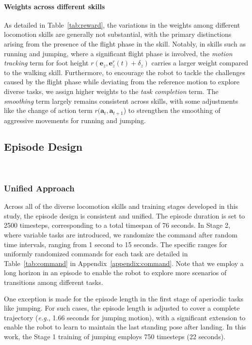 \paragraph{Weights across different skills}
As detailed in Table~\ref{tab:reward}, the variations in the weights among different locomotion skills are generally not substantial, with the primary distinctions arising from the presence of the flight phase in the skill. 
Notably, in skills such as running and jumping, where a significant flight phase is involved, the \textit{motion tracking} term for foot height $r(\mathbf{e}_z, \mathbf{e}^r_z(t) + \delta_z)$ carries a larger weight compared to the walking skill.
Furthermore, to encourage the robot to tackle the challenges caused by the flight phase while deviating from the reference motion to explore diverse tasks, we assign higher weights to the \textit{task completion} term. 
The \textit{smoothing} term largely remains consistent across skills, with some adjustments like the change of action term $r(\mathbf{a}_t, \mathbf{a}_{t+1}$) to strengthen the smoothing of aggressive movements for running and jumping.





\subsection{Episode Design}~\label{subsec:episode_design}

\subsubsection{Unified Approach}
Across all of the diverse locomotion skills and training stages developed in this study, the episode design is consistent and unified. 
The episode duration is set to 2500 timesteps, corresponding to a total timespan of 76 seconds. 
In Stage 2, where variable tasks are introduced, we randomize the command after random time intervals, ranging from 1 second to 15 seconds. 
The specific ranges for uniformly randomized commands for each task are detailed in Table~\ref{tab:command} in Appendix~\ref{appendix:command}. 
Note that we employ a long horizon in an episode to enable the robot to explore more scenarios of transitions among different tasks.

One exception is made for the episode length in the first stage of aperiodic tasks like jumping. 
For such cases, the episode length is adjusted to cover a complete trajectory (\textit{e.g.}, 1.66 seconds for jumping motion), with a significant extension to enable the robot to learn to maintain the last standing pose after landing. 
In this work, the Stage 1 training of jumping employs 750 timesteps (22 seconds).


